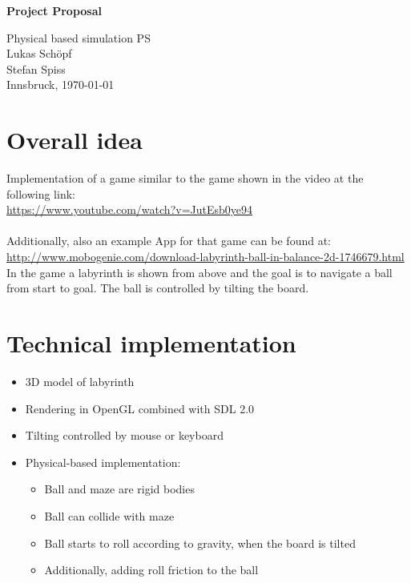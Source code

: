 \documentclass[11pt,a4paper]{article}
\begin{document}
\begin{center}
{\LARGE \bf Project Proposal}

Physical based simulation PS\\[5mm]

Lukas Sch\"opf\\Stefan Spiss\\[5mm]

Innsbruck, \today
\end{center}



\section{Overall idea}
\label{sec:overall}
Implementation of a game similar to the game shown in the video at the following link:\\
\href{https://www.youtube.com/watch?v=JutEsb0ye94}{https://www.youtube.com/watch?v=JutEsb0ye94}\\\\
Additionally, also an example App for that game can be found at: \\
\href{http://www.mobogenie.com/download-labyrinth-ball-in-balance-2d-1746679.html}{http://www.mobogenie.com/download-labyrinth-ball-in-balance-2d-1746679.html}\\

In the game a labyrinth is shown from above and the goal is to navigate a ball from start to goal. The ball is controlled by tilting the board. 

\section{Technical implementation}
\label{sec:technical}
\begin{itemize}
\item 3D model of labyrinth
\item Rendering in OpenGL combined with SDL 2.0
\item Tilting controlled by mouse or keyboard
\item Physical-based implementation:
\begin{itemize}
\item Ball and maze are rigid bodies
\item Ball can collide with maze
\item Ball starts to roll according to gravity, when the board is tilted
\item Additionally, adding roll friction to the ball
\end{itemize}
\end{itemize}
\end{document}
